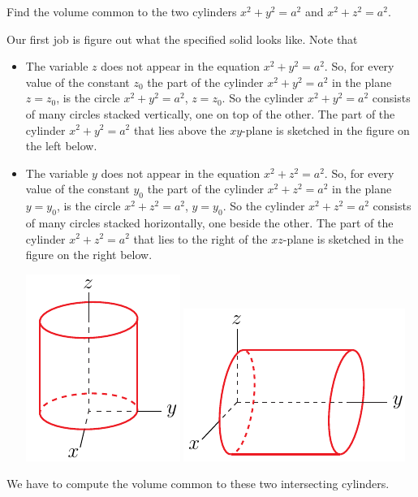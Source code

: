 \begin{eg}[Volume]\label{eg dblInt B}
Find the volume common to the two cylinders $x^2+y^2=a^2$ and
$x^2+z^2=a^2$.

\soln
Our first job is figure out what the specified solid looks like. 
Note that
\begin{itemize}
\item
The variable $z$ does not appear in the equation $x^2+y^2=a^2$.
So, for every value of the constant $z_0$ the part of the cylinder
$x^2+y^2=a^2$ in the plane $z=z_0$, is the circle $x^2+y^2=a^2$, $z=z_0$.
So the cylinder $x^2+y^2=a^2$ consists of many circles stacked
vertically, one on top of the other. The part of the cylinder
$x^2+y^2=a^2$ that lies above the $xy$-plane is sketched in the
figure on the left below.

\item
The variable $y$ does not appear in the equation $x^2+z^2=a^2$.
So, for every value of the constant $y_0$ the part of the cylinder
$x^2+z^2=a^2$ in the plane $y=y_0$, is the circle $x^2+z^2=a^2$, $y=y_0$.
So the cylinder $x^2+z^2=a^2$ consists of many circles stacked
horizontally, one beside the other. The part of the cylinder
$x^2+z^2=a^2$ that lies to the right of the $xz$-plane is sketched in the
figure on the right below.

\begin{efig}
\begin{center}
   \includegraphics{cylinderA.pdf}\qquad
   \includegraphics{cylinderB.pdf}
\end{center}
\end{efig}
\end{itemize}
\noindent
We have to compute the volume common to these two intersecting cylinders.


\end{eg}
